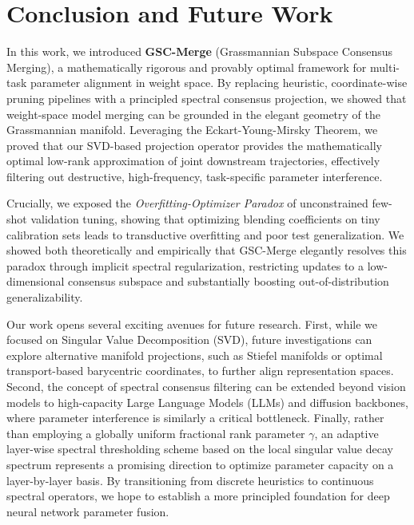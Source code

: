 \section{Conclusion and Future Work}
\label{sec:conclusion}

In this work, we introduced \textbf{GSC-Merge} (Grassmannian Subspace Consensus Merging), a mathematically rigorous and provably optimal framework for multi-task parameter alignment in weight space. By replacing heuristic, coordinate-wise pruning pipelines with a principled spectral consensus projection, we showed that weight-space model merging can be grounded in the elegant geometry of the Grassmannian manifold. Leveraging the Eckart-Young-Mirsky Theorem, we proved that our SVD-based projection operator provides the mathematically optimal low-rank approximation of joint downstream trajectories, effectively filtering out destructive, high-frequency, task-specific parameter interference.

Crucially, we exposed the \emph{Overfitting-Optimizer Paradox} of unconstrained few-shot validation tuning, showing that optimizing blending coefficients on tiny calibration sets leads to transductive overfitting and poor test generalization. We showed both theoretically and empirically that GSC-Merge elegantly resolves this paradox through implicit spectral regularization, restricting updates to a low-dimensional consensus subspace and substantially boosting out-of-distribution generalizability.

Our work opens several exciting avenues for future research. First, while we focused on Singular Value Decomposition (SVD), future investigations can explore alternative manifold projections, such as Stiefel manifolds or optimal transport-based barycentric coordinates, to further align representation spaces. Second, the concept of spectral consensus filtering can be extended beyond vision models to high-capacity Large Language Models (LLMs) and diffusion backbones, where parameter interference is similarly a critical bottleneck. Finally, rather than employing a globally uniform fractional rank parameter $\gamma$, an adaptive layer-wise spectral thresholding scheme based on the local singular value decay spectrum represents a promising direction to optimize parameter capacity on a layer-by-layer basis. By transitioning from discrete heuristics to continuous spectral operators, we hope to establish a more principled foundation for deep neural network parameter fusion.
